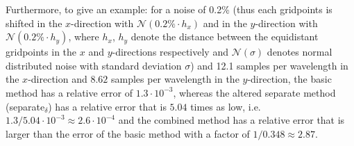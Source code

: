 \begin{table}[H]
{    Furthermore, to give an example: for a noise of 0.2\% (thus each gridpoints is shifted in the $x$-direction with $\mathcal N(0.2\% \cdot h_x)$ and in the $y$-direction with $\mathcal N(0.2\% \cdot h_y)$, where $h_x$, $h_y$ denote the distance between the equidistant gridpoints in the $x$ and $y$-directions respectively and $\mathcal N(\sigma)$ denotes normal distributed noise with standard deviation $\sigma$) and 12.1 samples per wavelength in the $x$-direction and $8.62$ samples per wavelength in the $y$-direction, the basic method has a relative error of $1.3\cdot 10^{-3}$, whereas the altered separate method (separate$_\delta$) has a relative error that is $5.04$ times as low, i.e. $1.3/5.04\cdot 10^{-3} \approx 2.6\cdot 10^{-4}$ and the combined method has a relative error that is larger than the error of the basic method with a factor of $1/0.348 \approx 2.87$.}
    \label{tab:single}
\end{table}


